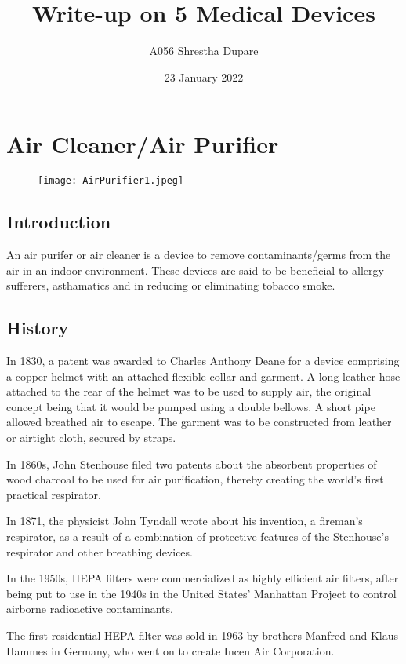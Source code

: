 \documentclass[12pt]{article}
\title{Write-up on 5 Medical Devices}
\author{A056 Shrestha Dupare}
\date{23 January 2022}
\begin{document}
\maketitle

\section{Air Cleaner/Air Purifier}


\begin{figure}[h]
\texttt{[image: AirPurifier1.jpeg]}
\centering
\end{figure}


\subsection{Introduction}

An air purifer or air cleaner is a device to remove contaminants/germs from the air in an indoor environment. These devices are said to be beneficial to allergy sufferers, asthamatics and in reducing or eliminating tobacco smoke.


\subsection{History}

In 1830, a patent was awarded to Charles Anthony Deane for a device comprising a copper helmet with an attached flexible collar and garment. A long leather hose attached to the rear of the helmet was to be used to supply air, the original concept being that it would be pumped using a double bellows. A short pipe allowed breathed air to escape. The garment was to be constructed from leather or airtight cloth, secured by straps.


In 1860s, John Stenhouse filed two patents about the absorbent properties of wood charcoal to be used for air purification, thereby creating the world's first practical respirator.


In 1871, the physicist John Tyndall wrote about his invention, a fireman's respirator, as a result of a combination of protective features of the Stenhouse's respirator and other breathing devices.


In the 1950s, HEPA filters were commercialized as highly efficient air filters, after being put to use in the 1940s in the United States' Manhattan Project to control airborne radioactive contaminants.


The first residential HEPA filter was sold in 1963 by brothers Manfred and Klaus Hammes in Germany, who went on to create Incen Air Corporation.
\end{document}
